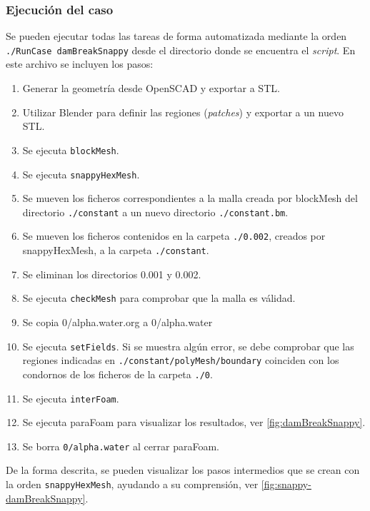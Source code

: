 \subsubsection{Ejecución del caso}\label{header-n927}

Se pueden ejecutar todas las tareas de forma automatizada mediante la
orden \lstinline[style=bash]{./RunCase damBreakSnappy} desde el directorio donde se
encuentra el \emph{script}. En este archivo se incluyen los pasos:

\begin{enumerate}
\def\labelenumi{\arabic{enumi}.}
\item
  Generar la geometría desde OpenSCAD y exportar a STL.
\item
  Utilizar Blender para definir las regiones (\emph{patches}) y exportar
  a un nuevo STL.
\item
  Se ejecuta \texttt{blockMesh}.
\item
  Se ejecuta \texttt{snappyHexMesh}.
\item
  Se mueven los ficheros correspondientes a la malla creada por
  blockMesh del directorio \lstinline[style=bash]{./constant} a un
  nuevo directorio \lstinline[style=bash]{./constant.bm}.
\item
  Se mueven los ficheros contenidos en la carpeta
  \lstinline[style=bash]{./0.002}, creados por snappyHexMesh, a la
  carpeta \lstinline[style=bash]{./constant}.
\item
  Se eliminan los directorios 0.001 y 0.002.
\item
  Se ejecuta \texttt{checkMesh} para comprobar que la malla es válidad.
\item
  Se copia 0/alpha.water.org a 0/alpha.water
\item
  Se ejecuta \texttt{setFields}. Si se muestra algún error, se debe
  comprobar que las regiones indicadas en
  \lstinline[style=bash]{./constant/polyMesh/boundary} coinciden con
  los condornos de los ficheros de la carpeta
  \lstinline[style=bash]{./0}.
\item
  Se ejecuta \texttt{interFoam}.
\item
  Se ejecuta paraFoam para visualizar los resultados, ver \autoref{fig:damBreakSnappy}.
\item
  Se borra \lstinline[style=bash]{0/alpha.water} al cerrar paraFoam.
\end{enumerate}

De la forma descrita, se pueden visualizar los pasos intermedios que se
crean con la orden \texttt{snappyHexMesh}, ayudando a su comprensión, ver \autoref{fig:snappy-damBreakSnappy}. 

